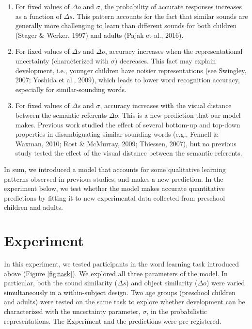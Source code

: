 \documentclass[10pt, letterpaper]{article}
\begin{document}
\begin{enumerate}
\def\labelenumi{\arabic{enumi})}
\item
  For fixed values of \(\Delta o\) and \(\sigma\), the probability of
  accurate responses increases as a function of \(\Delta s\). This
  pattern accounts for the fact that similar sounds are generally more
  challenging to learn than different sounds for both children (Stager
  \& Werker, 1997) and adults (Pajak et al., 2016).
\item
  For fixed values of \(\Delta s\) and \(\Delta o\), accuracy increases
  when the representational uncertainty (characterized with \(\sigma\))
  decreases. This fact may explain development, i.e., younger children
  have noisier representations (see Swingley, 2007; Yoshida et al.,
  2009), which leads to lower word recognition accuracy, especially for
  similar-sounding words.
\item
  For fixed values of \(\Delta s\) and \(\sigma\), accuracy increases
  with the visual distance between the semantic referents \(\Delta o\).
  This is a new prediction that our model makes. Previous work studied
  the effect of several bottom-up and top-down properties in
  disambiguating similar sounding words (e.g., Fennell \& Waxman, 2010;
  Rost \& McMurray, 2009; Thiessen, 2007), but no previous study tested
  the effect of the visual distance between the semantic referents.
\end{enumerate}

In sum, we introduced a model that accounts for some qualitative
learning patterns observed in previous studies, and makes a new
prediction. In the experiment below, we test whether the model makes
accurate quantitative predictions by fitting it to new experimental data
collected from preschool children and adults.

\section{Experiment}\label{experiment}

In this experiment, we tested participants in the word learning task
introduced above (Figure \ref{fig:task}). We explored all three
parameters of the model. In particular, both the sound similarity
(\(\Delta s\)) and object similarity (\(\Delta o\)) were varied
simultaneously in a within-subject design. Two age groups (preschool
children and adults) were tested on the same task to explore whether
development can be characterized with the uncertainty parameter,
\(\sigma\), in the probabilistic representations. The Experiment and the
predictions were pre-registered.
\end{document}
